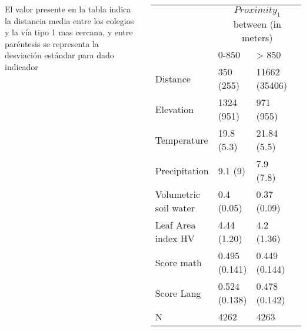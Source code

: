 \documentclass[20pt,margin=1in,innermargin=-4.5in,blockverticalspace=-0.25in]{tikzposter}
\begin{document}
\begin{columns}
{        El valor presente en la tabla indica la distancia media entre los colegios y la vía tipo 1 mas cercana, y entre paréntesis se representa la desviación estándar para dado indicador  
         \begin{center}
             \begin{tabular}{llll}
        \hline
                & \multicolumn{3}{c}{$Proximity_1$ between (in meters)}   
         
         \\
                                & 0-850                  & \textgreater{} 850    \\ 
        \hline
        Distance                & 350 \small{(255)}       & 11662 \small{(35406)} \\
        Elevation              & 1324 \small{(951)}      & 971 \small{(955)}      \\
        Temperature            & 19.8 \small{(5.3)}      & 21.84 \small{(5.5)}    \\
        Precipitation          & 9.1 \small{(9)}          & 7.9 \small{(7.8)}     \\
        Volumetric soil water  & 0.4 \small{(0.05)}      & 0.37 \small{(0.09)}    \\
        Leaf Area index HV     & 4.44 \small{(1.20)}     & 4.2 \small{(1.36) }    \\
        Score math             & 0.495 \small{(0.141)}   & 0.449 \small{(0.144)}  \\
        Score Lang             & 0.524 \small{(0.138)}   & 0.478 \small{(0.142)}  \\   
        N                       & 4262           & 4263         \\
        \hline
        \end{tabular}
         \end{center}

     
     }
\end{columns}
\end{document}
